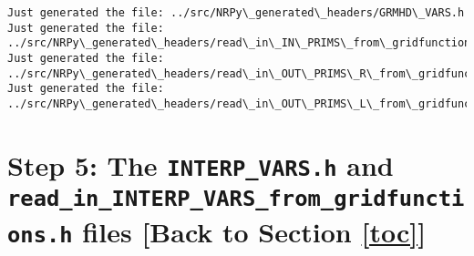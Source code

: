\documentclass[landscape,letterpaper,10pt,english]{article}
\begin{document}
    \begin{Verbatim}[commandchars=\\\{\}]
Just generated the file: ../src/NRPy\_generated\_headers/GRMHD\_VARS.h
Just generated the file:
../src/NRPy\_generated\_headers/read\_in\_IN\_PRIMS\_from\_gridfunctions.h
Just generated the file:
../src/NRPy\_generated\_headers/read\_in\_OUT\_PRIMS\_R\_from\_gridfunctions.h
Just generated the file:
../src/NRPy\_generated\_headers/read\_in\_OUT\_PRIMS\_L\_from\_gridfunctions.h
    \end{Verbatim}

    \section{\texorpdfstring{Step 5: The \texttt{INTERP\_VARS.h} and
\texttt{read\_in\_INTERP\_VARS\_from\_gridfunctions.h} files {[}Back to
Section \ref{toc}{]}}{Step 5: The INTERP\_VARS.h and read\_in\_INTERP\_VARS\_from\_gridfunctions.h files {[}Back to {]}}}\label{step-5-the-interp_vars.h-and-read_in_interp_vars_from_gridfunctions.h-files-back-to-top}

\[\label{read_in_INTERP_VARS}\]
\end{document}
